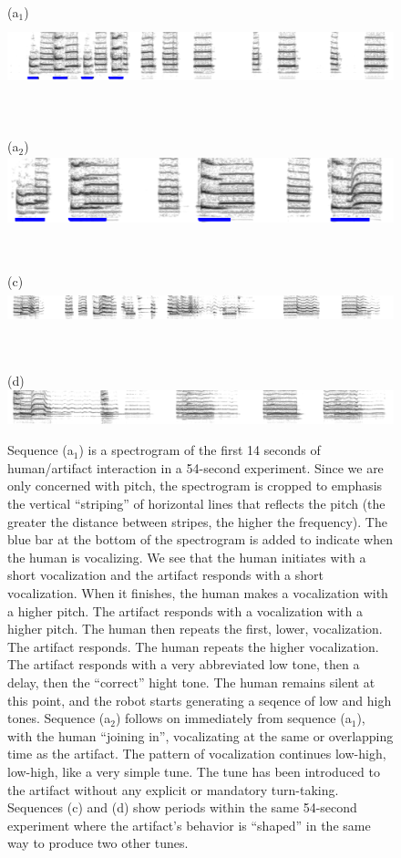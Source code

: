 \begin{figure}[bt]

\centerline{(a$_1$) \includegraphics[height=2cm]{images/chico-separate-begin-labelled}}

\ \\

\centerline{(a$_2$) \includegraphics[height=2cm]{images/chico-separate-together-labelled}}

\ \\

\centerline{(c) \includegraphics[height=1cm]{images/chico-pair}}

\ \\

\centerline{(d) \includegraphics[height=1cm]{images/chico-ohm}}


\caption{
%
\label{fig:sing-spectrogram}
%
Sequence (a$_1$) is a spectrogram of the first 14 seconds of human/artifact 
interaction in a 54-second experiment. 
Since we are only concerned with pitch, the 
spectrogram is cropped to emphasis the vertical ``striping'' of 
horizontal lines that reflects the pitch (the greater 
the distance between stripes, the higher the frequency).
The blue bar at the bottom of the spectrogram is added to 
indicate when the human is vocalizing.
%
We see that the human initiates with a short vocalization
and the artifact responds with a short vocalization.  When it
finishes, the human makes a vocalization with a higher pitch.
The artifact responds with a vocalization with a higher pitch.
The human then repeats the first, lower, vocalization.
The artifact responds.  The human repeats the higher vocalization.
The artifact responds with a very abbreviated low tone, then a delay,
then the ``correct'' hight tone.  The human remains silent at this
point, and the robot starts generating a seqence of low and high
tones.
%
Sequence (a$_2$) follows on immediately from sequence (a$_1$), with 
the human ``joining in'', vocalizating at the same or overlapping time 
as the artifact.  The pattern of vocalization continues low-high,
low-high, like a very simple tune.
%
The tune has been introduced to the artifact without any
explicit or mandatory turn-taking.
%
Sequences (c) and (d) show periods within the same 54-second experiment
where the artifact's behavior is ``shaped'' in the same way
to produce two other tunes.
}

\end{figure}



